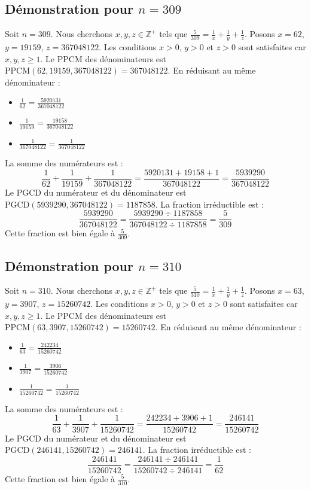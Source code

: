 \documentclass[11pt,a4paper]{article}
\begin{document}
\subsection{Démonstration pour $n = 309$}
Soit $n = 309$. Nous cherchons $x, y, z \in \mathbb{Z}^{+}$ tels que $\frac{5}{309} = \frac{1}{x} + \frac{1}{y} + \frac{1}{z}$.
Posons $x = 62$, $y = 19159$, $z = 367048122$.
Les conditions $x > 0$, $y > 0$ et $z > 0$ sont satisfaites car $x, y, z \geq 1$.
Le PPCM des dénominateurs est $\text{PPCM}(62, 19159, 367048122) = 367048122$.
En réduisant au même dénominateur :
\begin{itemize}
    \item $\frac{1}{62} = \frac{5920131}{367048122}$
    \item $\frac{1}{19159} = \frac{19158}{367048122}$
    \item $\frac{1}{367048122} = \frac{1}{367048122}$
\end{itemize}
La somme des numérateurs est :
$$ \frac{1}{62} + \frac{1}{19159} + \frac{1}{367048122} = \frac{5920131 + 19158 + 1}{367048122} = \frac{5939290}{367048122} $$
Le PGCD du numérateur et du dénominateur est $\text{PGCD}(5939290, 367048122) = 1187858$.
La fraction irréductible est :
$$ \frac{5939290}{367048122} = \frac{5939290 \div 1187858}{367048122 \div 1187858} = \frac{5}{309} $$
Cette fraction est bien égale à $\frac{5}{309}$.

\subsection{Démonstration pour $n = 310$}
Soit $n = 310$. Nous cherchons $x, y, z \in \mathbb{Z}^{+}$ tels que $\frac{5}{310} = \frac{1}{x} + \frac{1}{y} + \frac{1}{z}$.
Posons $x = 63$, $y = 3907$, $z = 15260742$.
Les conditions $x > 0$, $y > 0$ et $z > 0$ sont satisfaites car $x, y, z \geq 1$.
Le PPCM des dénominateurs est $\text{PPCM}(63, 3907, 15260742) = 15260742$.
En réduisant au même dénominateur :
\begin{itemize}
    \item $\frac{1}{63} = \frac{242234}{15260742}$
    \item $\frac{1}{3907} = \frac{3906}{15260742}$
    \item $\frac{1}{15260742} = \frac{1}{15260742}$
\end{itemize}
La somme des numérateurs est :
$$ \frac{1}{63} + \frac{1}{3907} + \frac{1}{15260742} = \frac{242234 + 3906 + 1}{15260742} = \frac{246141}{15260742} $$
Le PGCD du numérateur et du dénominateur est $\text{PGCD}(246141, 15260742) = 246141$.
La fraction irréductible est :
$$ \frac{246141}{15260742} = \frac{246141 \div 246141}{15260742 \div 246141} = \frac{1}{62} $$
Cette fraction est bien égale à $\frac{5}{310}$.
\end{document}
